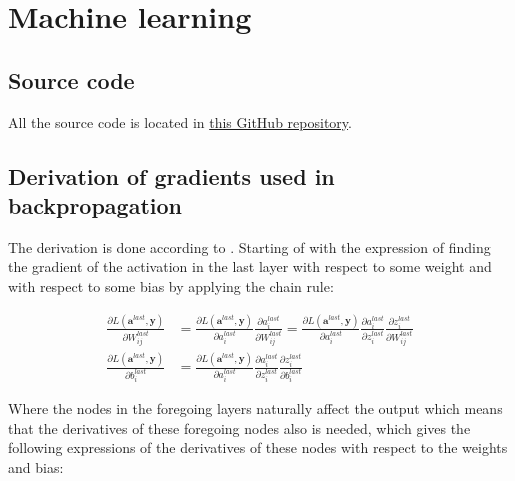 \documentclass[../main.tex]{subfiles}
\begin{document}
\chapter{Machine learning}
\label{sec:first-app}

\section{Source code}
All the source code is located in \href{https://github.com/philipkarim/master_thesis}{this GitHub repository}.

\section{Derivation of gradients used in backpropagation}
The derivation is done according to \cite[ch.~7]{rojasRa:nnsystematic}. Starting of with the expression of finding the gradient of the activation in the last layer with respect to some weight and with respect to some bias by applying the chain rule:

\begin{align}
     \frac{\partial L\left(\boldsymbol{a}^{last}, \boldsymbol{y}\right)}{\partial W_{i j}^{last}}&=\frac{\partial L\left(\boldsymbol{a}^{last}, \boldsymbol{y}\right)}{\partial a_{i}^{last}} \frac{\partial a_{i}^{last}}{\partial W_{i j}^{last}}=\frac{\partial L\left(\boldsymbol{a}^{last}, \boldsymbol{y}\right)}{\partial a_{i}^{last}} \frac{\partial a_{i}^{last}}{\partial z_{i}^{last}} \frac{\partial z_{i}^{last}}{\partial W_{i j}^{last}}\\
     \frac{\partial L\left(\boldsymbol{a}^{last}, \boldsymbol{y}\right)}{\partial b_{i}^{last}}&=\frac{\partial L\left(\boldsymbol{a}^{last}, \boldsymbol{y}\right)}{\partial a_{i}^{last}} \frac{\partial a_{i}^{last}}{\partial z_{i}^{last}} \frac{\partial z_{i}^{last}}{\partial b_{i}^{last}}
\end{align}

Where the nodes in the foregoing layers naturally affect the output which means that the derivatives of these foregoing nodes also is needed, which gives the following expressions of the derivatives of these nodes with respect to the weights and bias:
\end{document}
